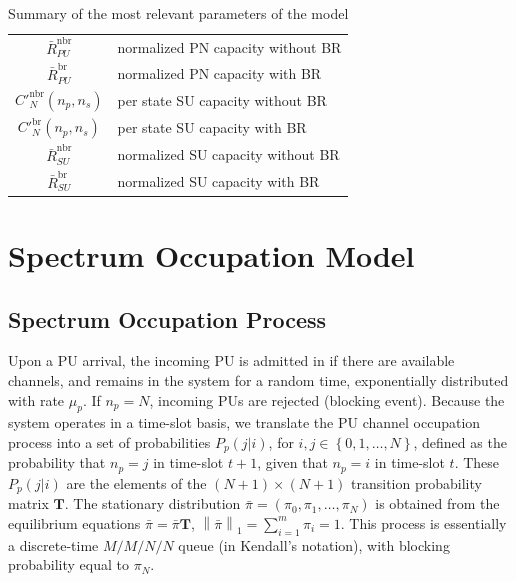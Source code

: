 \begin{table}
\begin{tabular}{|c|l|}
$\bar{R}^{\text{nbr}}_{PU}$ & normalized PN capacity without BR\\
$\bar{R}^{\text{br}}_{PU}$ & normalized PN capacity with BR\\
$C'^{\text{nbr}}_{N}\left(n_{p},n_{s}\right)$ & per state SU capacity without BR\\
$C'^{\text{br}}_{N}\left(n_{p},n_{s}\right)$ & per state SU capacity with BR\\
$\bar{R}^{\text{nbr}}_{SU}$ & normalized SU capacity without BR\\
$\bar{R}^{\text{br}}_{SU}$ & normalized SU capacity with BR\\\hline
\end{tabular}
\centering
\caption{Summary of the most relevant parameters of the model}
\label{BR_table_parameters}
\end{table}

\section{Spectrum Occupation Model}\label{sec:Model}
\subsection{Spectrum Occupation Process}
Upon a PU arrival, the incoming PU is admitted in if there are available channels, and remains in the system for a random time, exponentially distributed with rate $\mu_{p}$. If $n_{p}=N$, incoming PUs are rejected (blocking event).
Because the system operates in a time-slot basis, we translate the PU channel occupation process into a set of probabilities $P_{p}(j|i)$, for $i,j \in \left\{0,1,\ldots,N\right\}$, defined as the probability that $n_{p}=j$ in time-slot $t+1$, given that $n_{p}=i$ in time-slot $t$. 
These $P_{p}(j|i)$ are the elements of the $\left(N+1\right)\times\left(N+1\right)$ transition probability matrix $\mathbf{T}$. The stationary distribution $\bar{\pi} = \left(\pi_{0},\pi_{1},\dots,\pi_{N}\right)$ is obtained from the equilibrium equations $\bar{\pi} = \bar{\pi}\mathbf{T}$, $\left\|\bar{\pi}\right\|_{1} = \sum_{i=1}^{m}\pi_{i}=1$.
This process is essentially a discrete-time $M/M/N/N$ queue (in Kendall's notation), with blocking probability equal to $\pi_{N}$.

